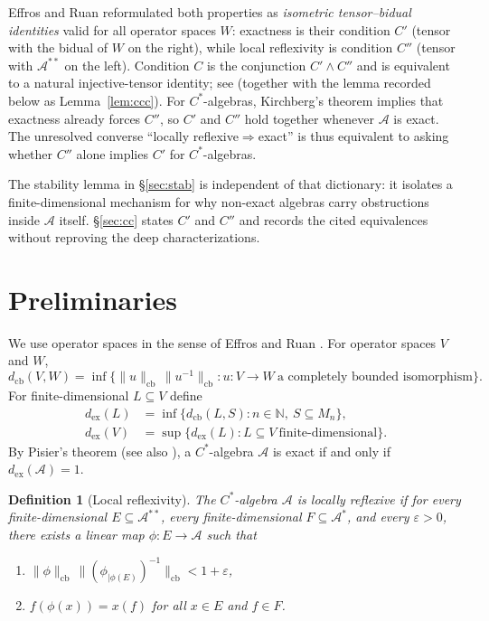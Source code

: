 \documentclass[12pt]{article}
\newtheorem{definition}[theorem]{Definition}
\newcommand{\A}{\mathcal A}
\newcommand{\dex}{d_{\mathrm{ex}}}
\newcommand{\dcb}{d_{\mathrm{cb}}}
\newcommand{\Mn}{M_n}
\begin{document}
Effros and Ruan reformulated both properties as \emph{isometric tensor--bidual identities} valid for all operator spaces $W$: exactness is their condition $C'$ (tensor with the bidual of $W$ on the right), while local reflexivity is condition $C''$ (tensor with $\A^{**}$ on the left).  Condition $C$ is the conjunction $C'\wedge C''$ and is equivalent to a natural injective-tensor identity; see \cite[\S17.1, Thm.~PEX.1, Thm.~PLR1.1]{ER} (together with the lemma recorded below as Lemma~\ref{lem:ccc}).  For $C^*$-algebras, Kirchberg's theorem implies that exactness already forces $C''$, so $C'$ and $C''$ hold together whenever $\A$ is exact.  The unresolved converse ``locally reflexive$\Rightarrow$exact'' is thus equivalent to asking whether $C''$ alone implies $C'$ for $C^*$-algebras.

The stability lemma in \S\ref{sec:stab} is independent of that dictionary: it isolates a finite-dimensional mechanism for why non-exact algebras carry obstructions inside $\A$ itself.  \S\ref{sec:cc} states $C'$ and $C''$ and records the cited equivalences without reproving the deep characterizations.

\section{Preliminaries}\label{sec:prelim}

We use operator spaces in the sense of Effros and Ruan \cite{ER}.  For operator spaces $V$ and $W$,
\[
        \dcb(V,W)=\inf\bigl\{\|u\|_{\mathrm{cb}}\,\|u^{-1}\|_{\mathrm{cb}} : u:V\to W\ \text{a completely bounded isomorphism}\bigr\}.
\]
For finite-dimensional $L\subseteq V$ define
\begin{align*}
        \dex(L) &= \inf\bigl\{\dcb(L,S): n\in\mathbb N,\ S\subseteq \Mn\bigr\},\\
        \dex(V) &= \sup\bigl\{\dex(L): L\subseteq V\ \text{finite-dimensional}\bigr\}.
\end{align*}
By Pisier's theorem \cite[Thm.~17.1]{Pisier} (see also \cite[Thm.~14.4.1]{ER}), a $C^*$-algebra $\A$ is exact if and only if $\dex(\A)=1$.

\begin{definition}[Local reflexivity]\label{def:lr}
The $C^*$-algebra $\A$ is \emph{locally reflexive} if for every finite-dimensional $E\subseteq \A^{**}$, every finite-dimensional $F\subseteq \A^*$, and every $\varepsilon>0$, there exists a linear map $\phi:E\to \A$ such that
\begin{enumerate}[label=(\roman*),leftmargin=2.4em]
\item $\|\phi\|_{\mathrm{cb}}\,\|(\phi_{|\phi(E)})^{-1}\|_{\mathrm{cb}} < 1+\varepsilon$,
\item $f(\phi(x))=x(f)$ for all $x\in E$ and $f\in F$.
\end{enumerate}
\end{definition}
\end{document}
